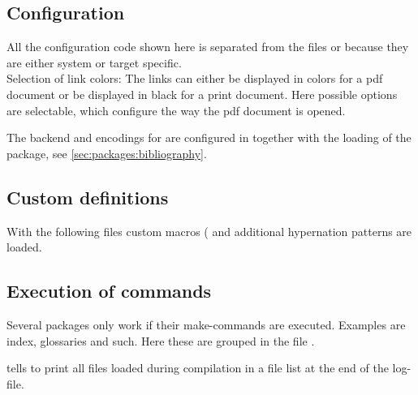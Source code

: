 \subsection{Configuration}
\label{sec:preamble:configuration}
All the configuration code shown here is separated from the files  or  because they are either system or target specific.
\medskip\\\noindent
%
Selection of link colors: The links can either be displayed in colors for a pdf document or be displayed in black for a print document.
%
Here possible options are selectable, which configure the way the pdf document is opened.

The backend and encodings for  are configured in  together with the loading of the package, see \cref{sec:packages:bibliography}.
\subsection{Custom definitions}
\label{sec:preamble:custom}

With the following files custom macros ( and additional hypernation patterns  are loaded. 

\subsection{Execution of commands}
\label{sec:preamble:ExecutionOfCommands}
Several packages only work if their make-commands are executed. Examples are index, glossaries and such. Here these are grouped in the file . 

 tells \latex to print all files loaded during compilation in a file list at the end of the log-file.
%

